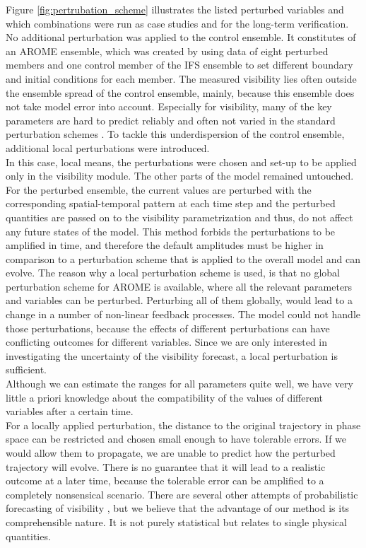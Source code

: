 Figure \ref{fig:pertrubation_scheme} illustrates the listed perturbed variables and which combinations were run as case studies and for the long-term verification. No additional perturbation was applied to the control ensemble. It constitutes of an AROME ensemble, which was created by using data of eight perturbed members and one control member of the IFS ensemble to set different boundary and initial conditions for each member. The measured visibility lies often outside the ensemble spread of the control ensemble, mainly, because this ensemble does not take model error into account. Especially for visibility, many of the key parameters are hard to predict reliably and often not varied in the standard perturbation schemes \cite{chmielecki2011probabilistic}. To tackle this underdispersion of the control ensemble, additional local perturbations were introduced.\\
In this case, local means, the perturbations were chosen and set-up to be applied only in the visibility module. The other parts of the model remained untouched. \\
For the perturbed ensemble, the current values are perturbed with the corresponding spatial-temporal pattern  at each time step and the perturbed quantities are passed on to the visibility parametrization and thus, do not affect any future states of the model. This method forbids the perturbations to be amplified in time, and therefore the default amplitudes must be higher in comparison to a perturbation scheme that is applied to the overall model and can evolve.
The reason why a local perturbation scheme is used, is that no global perturbation scheme for AROME is available, where all the relevant parameters and variables can be perturbed.
Perturbing all of them globally, would lead to a change in a number of non-linear feedback processes. The model could not handle those perturbations, because the effects of different perturbations can have conflicting outcomes for different variables. Since we are only interested in investigating the uncertainty of the visibility forecast, a local perturbation is sufficient.\\
Although we can estimate the ranges for all parameters quite well, we have very little a priori knowledge about the compatibility of the values of different variables after a certain time.\\
For a locally applied perturbation, the distance to the original trajectory in phase space can be restricted and chosen small enough to have tolerable errors. If we would allow them to propagate, we are unable to predict how the perturbed trajectory will evolve. There is no guarantee that it will lead to a realistic outcome at a later time, because the tolerable error can be amplified to a completely nonsensical scenario. 
There are several other attempts of probabilistic forecasting of visibility \cite{chmielecki2011probabilistic, Roquelaure}, but we believe that the advantage of our method is its comprehensible nature. It is not purely statistical but relates to single physical quantities.\\

